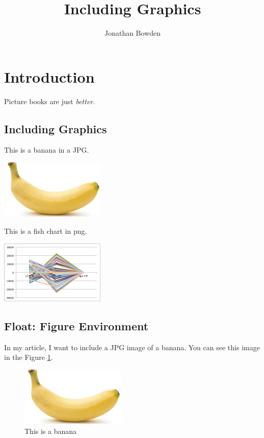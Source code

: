\documentclass{proc}
\title{Including Graphics}
\author{Jonathan Bowden}
\begin{document}
\maketitle

\section{Introduction}

Picture books are just \emph{better}.

\subsection{Including Graphics}

This is a banana in a JPG.

\begin{center}
\includegraphics[width=5cm]{banana.jpg}
\end{center}

This is a fish chart in png.

\begin{center}
\includegraphics[width=5cm]{fish.png}
\end{center}

\subsection{Float: Figure Environment}

In my article, I want to include a JPG image of a banana. You can see this image in the Figure \ref{fig:banana}.

\begin{figure}[htbp]
	\begin{center}
		\includegraphics[width=5cm]{banana.jpg}
		\caption{This is a banana}
		\label{fig:banana}		
	\end{center}
\end{figure}
\end{document}
